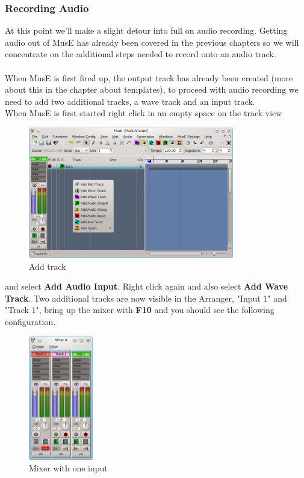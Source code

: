 \documentclass[a4paper]{report}
\newcommand{\menu}[1]{\textbf{#1}}
\newcommand{\screenshotwidth}[0]{0.8\textwidth}
\begin{document}
\subsubsection{Recording Audio}
At this point we'll make a slight detour into full on audio recording. Getting
audio out of MusE has already been covered in the previous chapters so we will
concentrate on the additional steps needed to record onto an audio track.\\
\\
When MusE is first fired up, the
output track has already been created (more about this in the chapter about 
templates), to proceed with audio recording we need to add two additional tracks, a 
wave track and an input track.\\
When MusE is first started right click in an empty space on the track view
\begin{figure}[htp]
\centering \includegraphics[width=\screenshotwidth]
{pics/main_window_add_track}
\caption{Add track}
\label{fig:Add track}
\end{figure}
and select \menu{Add Audio Input}. Right click again and also select 
\menu{Add Wave Track}. Two additional tracks are now visible in the Arranger, 
"Input 1" and "Track 1", bring up the mixer with \menu{F10} and you should see 
the following configuration.
\begin{figure}[htp]
\centering \includegraphics[width=0.25\textwidth]{pics/mixer_with_one_input} 
\caption{Mixer with one input}
\label{fig:Mixer with one input}
\end{figure}
\end{document}

